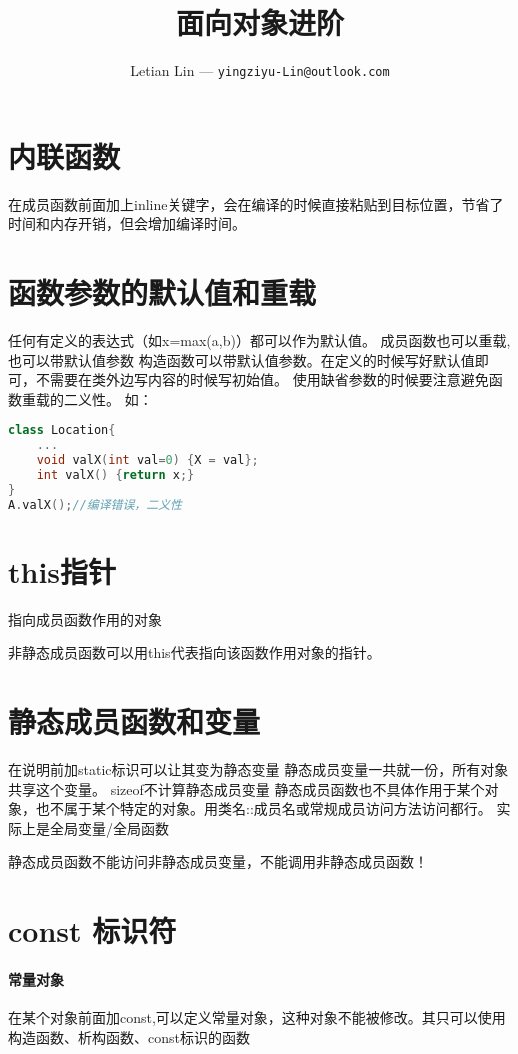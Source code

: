 \documentclass[UTF8]{ctexart}
\title{
	面向对象进阶
}
\author{
	Letian Lin --- \texttt{yingziyu-Lin@outlook.com}
}
\begin{document}
\maketitle
\section{内联函数}
在成员函数前面加上inline关键字，会在编译的时候直接粘贴到目标位置，节省了时间和内存开销，但会增加编译时间。

\section{函数参数的默认值和重载}
任何有定义的表达式（如x=max(a,b)）都可以作为默认值。
成员函数也可以重载,也可以带默认值参数
构造函数可以带默认值参数。在定义的时候写好默认值即可，不需要在类外边写内容的时候写初始值。
使用缺省参数的时候要注意避免函数重载的二义性。
如：
\begin{lstlisting}[language=C++]
class Location{
	...
	void valX(int val=0) {X = val};
	int valX() {return x;}
}
A.valX();//编译错误，二义性
\end{lstlisting}

\section{this指针}
指向成员函数作用的对象

非静态成员函数可以用this代表指向该函数作用对象的指针。

\section{静态成员函数和变量}
在说明前加static标识可以让其变为静态变量
静态成员变量一共就一份，所有对象共享这个变量。
sizeof不计算静态成员变量
静态成员函数也不具体作用于某个对象，也不属于某个特定的对象。用类名::成员名或常规成员访问方法访问都行。
实际上是全局变量/全局函数

静态成员函数不能访问非静态成员变量，不能调用非静态成员函数！

\section{const 标识符}
\paragraph{常量对象}在某个对象前面加const,可以定义常量对象，这种对象不能被修改。其只可以使用构造函数、析构函数、const标识的函数
\end{document}
